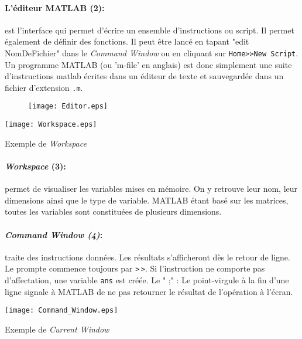 \paragraph{L'éditeur MATLAB (2): } est l'interface qui permet d'écrire
un ensemble d'instructions ou script. Il permet également de définir 
des fonctions. Il peut être lancé en tapant "edit NomDeFichier" dans le 
\emph{Command Window} ou en cliquant sur \verb?Home>>New Script?.
Un programme MATLAB (ou 'm-file' en anglais) est donc simplement
une suite d'instructions matlab écrites dans un éditeur de texte et 
sauvegardée dans un fichier d'extension \texttt{.m}.
\begin{figure}[!h]
    \centering
    \texttt{[image: Editor.eps]}
\end{figure}
\begin{marginfigure}
    \centering
    \texttt{[image: Workspace.eps]}
    \caption{Exemple de \emph{Workspace}\label{fig-Workspace}}    
\end{marginfigure}
\paragraph*{\emph{Workspace} (3): } permet de visualiser les variables mises 
en mémoire. On y retrouve leur nom, leur dimensions ainsi que le type 
de variable. MATLAB étant basé sur les matrices, toutes les
variables sont constituées de plusieurs dimensions.

\paragraph*{\emph{Command Window (4)}: } traite des instructions
données. Les résultats s'afficheront dès le retour de ligne. Le prompte 
commence toujours par \texttt{>}\,\texttt{>}. Si l'instruction ne 
comporte pas d'affectation, une variable \texttt{ans} est créée.
Le " ;" : Le point-virgule à la fin d'une ligne signale à MATLAB de ne pas
retourner le résultat de l'opération à l'écran.
\begin{marginfigure}
    \centering
    \texttt{[image: Command\_Window.eps]}
    \caption{Exemple de \emph{Current Window}\label{fig-CW}}    
\end{marginfigure}
\clearpage
\restoregeometry
\captionsetup{width=0.9\linewidth}
